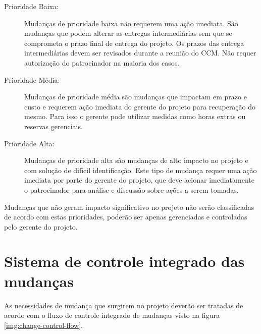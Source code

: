 \begin{description}
	\item[Prioridade Baixa:] Mudanças de prioridade baixa não requerem uma ação imediata. São mudanças que podem alterar as entregas intermediárias sem que se comprometa o prazo final de entrega do projeto. Os prazos das entrega intermediárias devem ser revisados durante a reunião do CCM. Não requer autorização do patrocinador na maioria dos casos.
	\item[Prioridade Média:] Mudanças de prioridade média são mudanças que impactam em prazo e custo e requerem ação imediata do gerente do projeto para recuperação do mesmo. Para isso o gerente pode utilizar medidas como horas extras ou reservas gerenciais.
	\item[Prioridade Alta:] Mudanças de prioridade alta são mudanças de alto impacto no projeto e com solução de difícil identificação. Este tipo de mudança requer uma ação imediata por parte do gerente do projeto, que deve acionar imediatamente o patrocinador para análise e discussão sobre ações a serem tomadas.
\end{description}

Mudanças que não geram impacto significativo no projeto não serão classificadas de acordo com estas prioridades, poderão ser apenas gerenciadas e controladas pelo gerente do projeto.

\section{Sistema de controle integrado das mudanças}
\label{sec:change-control-system}

As necessidades de mudança que surgirem no projeto deverão ser tratadas de acordo com o fluxo de controle integrado de mudanças visto na figura \ref{img:change-control-flow}.

